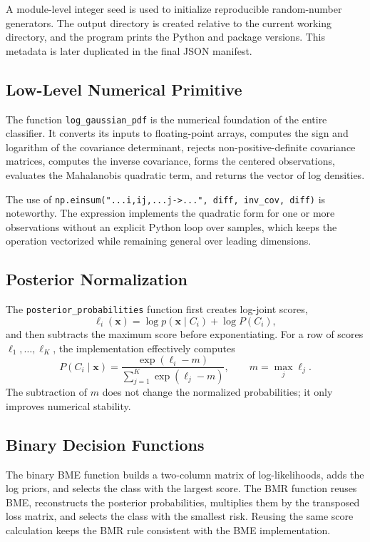 \documentclass[11pt,a4paper]{article}
\newcommand{\code}[1]{\texttt{#1}}
\begin{document}
A module-level integer seed is used to initialize reproducible random-number generators. The output directory is created relative to the current working directory, and the program prints the Python and package versions. This metadata is later duplicated in the final JSON manifest.

\subsection{Low-Level Numerical Primitive}
The function \code{log\_gaussian\_pdf} is the numerical foundation of the entire classifier. It converts its inputs to floating-point arrays, computes the sign and logarithm of the covariance determinant, rejects non-positive-definite covariance matrices, computes the inverse covariance, forms the centered observations, evaluates the Mahalanobis quadratic term, and returns the vector of log densities.

The use of \code{np.einsum("...i,ij,...j->...", diff, inv\_cov, diff)} is noteworthy. The expression implements the quadratic form for one or more observations without an explicit Python loop over samples, which keeps the operation vectorized while remaining general over leading dimensions.

\subsection{Posterior Normalization}
The \code{posterior\_probabilities} function first creates log-joint scores,
\begin{equation}
\ell_i(\mathbf{x})
=
\log p(\mathbf{x}\mid C_i)+\log P(C_i),
\end{equation}
and then subtracts the maximum score before exponentiating. For a row of scores $\ell_1,\ldots,\ell_K$, the implementation effectively computes
\begin{equation}
P(C_i\mid\mathbf{x})
=
\frac{\exp(\ell_i-m)}
{\sum_{j=1}^{K}\exp(\ell_j-m)},
\qquad
m=\max_j \ell_j.
\end{equation}
The subtraction of $m$ does not change the normalized probabilities; it only improves numerical stability.

\subsection{Binary Decision Functions}
The binary BME function builds a two-column matrix of log-likelihoods, adds the log priors, and selects the class with the largest score. The BMR function reuses BME, reconstructs the posterior probabilities, multiplies them by the transposed loss matrix, and selects the class with the smallest risk. Reusing the same score calculation keeps the BMR rule consistent with the BME implementation.
\end{document}
